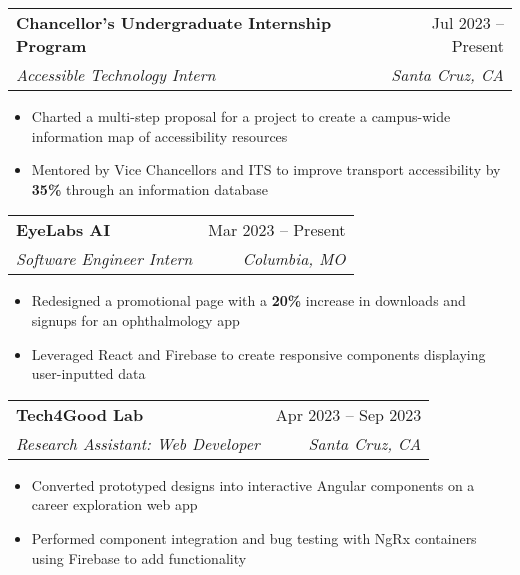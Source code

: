 \documentclass[letterpaper,11pt]{article}
\makeatletter
\newcommand{\resumeItem}[1]{
  \item\small{
    {#1 \vspace{-2pt}}
  }
}
\newcommand{\resumeSubheading}[4]{
  \vspace{-2pt}\item
    \begin{tabular*}{0.97\textwidth}[t]{l@{\extracolsep{\fill}}r}
      \textbf{#1} & #2 \\
      \textit{\small#3} & \textit{\small #4} \\
    \end{tabular*}\vspace{-7pt}
}
\newcommand{\resumeItemListStart}{\begin{itemize}}
\newcommand{\resumeItemListEnd}{\end{itemize}\vspace{-5pt}}
\makeatother
\begin{document}
\resumeSubheading
{Chancellor's Undergraduate Internship Program}{Jul 2023 -- Present}
{Accessible Technology Intern}{Santa Cruz, CA}
\resumeItemListStart
\resumeItem{Charted a multi-step proposal for a project to create a campus-wide information map of accessibility resources}
\resumeItem{Mentored by Vice Chancellors and ITS to improve transport accessibility by \textbf{35\%} through an information database}
\resumeItemListEnd

\resumeSubheading
{EyeLabs AI}{Mar 2023 -- Present}
{Software Engineer Intern}{Columbia, MO}
\resumeItemListStart
\resumeItem{Redesigned a promotional page with a \textbf{20\%} increase in downloads and signups for an ophthalmology app}
\resumeItem{Leveraged React and Firebase to create responsive components displaying user-inputted data}
\resumeItemListEnd

\resumeSubheading
{Tech4Good Lab}{Apr 2023 -- Sep 2023}
{Research Assistant: Web Developer}{Santa Cruz, CA}
\resumeItemListStart
\resumeItem{Converted prototyped designs into interactive Angular components on a career exploration web app}
\resumeItem{Performed component integration and bug testing with NgRx containers using Firebase to add functionality}
\resumeItemListEnd



\end{document}
